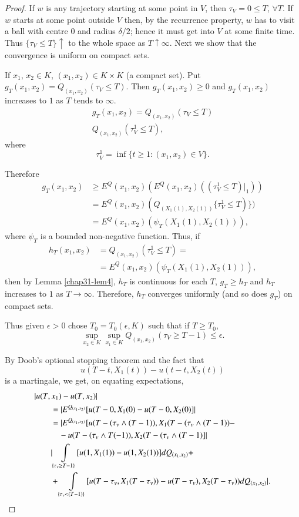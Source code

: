 \begin{proof}
If $w$ is any trajectory starting at some point in $V$, then
$\tau_{V}=0\leq T$, $\forall T$. If $w$ starts at some point outside
$V$ then, by the recurrence property, $w$ has to visit a ball with
centre $0$ and radius $\delta/2$; hence it must get into $V$ at some
finite time. Thus $\{\tau_{V}\leq T\}\uparrow$ to the whole space as
$T\uparrow \infty$. Next we show that the convergence is uniform on
compact sets.

If $x_{1}$, $x_{2}\in K$, $(x_{1},x_{2})\in K\times K$ (a compact
set). Put $g_{T}(x_{1},x_{2})=Q_{(x_{1},x_{2})}(\tau_{V}\leq T)$. Then
$g_{T}(x_{1},x_{2})\geq 0$ and $g_{T}(x_{1},x_{2})$ increases to $1$
as $T$ tends to $\infty$.
\begin{gather*}
g_{T}(x_{1},x_{2})=Q_{(x_{1},x_{2})}(\tau_{V}\leq T)\\
Q_{(x_{1},x_{2})}(\tau^{1}_{V}\leq T),
\end{gather*}\pageoriginale
where 
$$
\tau^{1}_{V}=\inf \{t\geq 1:(x_{1},x_{2})\in V\}.
$$

Therefore
\begin{align*}
g_{T}(x_{1},x_{2}) &\geq
E^{Q}(x_{1},x_{2})(E^{Q}(x_{1},x_{2})((\tau^{1}_{V}\leq T)|_{1}))\\
&= E^{Q}(x_{1},x_{2})(Q_{(X_{1}(1),X_{2}(1))}\{\tau^{1}_{V}\leq
T)\})\\
&= E^{Q}(x_{1},x_{2})(\psi_{T}(X_{1}(1),X_{2}(1))),
\end{align*}
where $\psi_{T}$ is a bounded non-negative function. Thus, if 
\begin{align*}
h_{T}(x_{1},x_{2}) &= Q_{(x_{1},x_{2})}(\tau^{1}_{V}\leq T)=\\
&= E^{Q}(x_{1},x_{2})(\psi_{T}(X_{1}(1),X_{2}(1))),
\end{align*}
then by Lemma \ref{chap31-lem4}, $h_{T}$ is continuous for each $T$,
$g_{T}\geq h_{T}$ and $h_{T}$ increases to $1$ as $T\to
\infty$. Therefore, $h_{T}$ converges uniformly (and so does $g_{T}$)
on compact sets.

Thus given $\epsilon>0$ chose $T_{0}=T_{0}(\epsilon,K)$ such that if
$T\geq T_{0}$,
$$
\sup\limits_{x_{2}\in K}\sup\limits_{x_{1}\in
  K}Q_{(x_{1},x_{2})}(\tau_{V}\geq T-1)\leq \epsilon.
$$

By Doob's optional stopping theorem and the fact that
$$
u(T-t,X_{1}(t))-u(t-t,X_{2}(t))
$$ 
is a martingale, we get, on equating
expectations, 
{\fontsize{10pt}{12pt}\selectfont
\begin{align*}
& |u(T,x_{1})-u(T,x_{2})|\\
&\qquad =|E^{Q_{(x_{1},x_{2})}}[u(T-0,X_{1}(0)-u(T-0,X_{2}(0)]|\\
&\qquad =|E^{Q_{(x_{1},x_{2})}}[u(T-(\tau_{v}\wedge
    (T-1)),X_{1}(T-(\tau_{v}\wedge (T-1))-\\
&\qquad\quad -u(T-(\tau_{v}\wedge T(-1)),X_{2}(T-(\tau_{v}\wedge (T-1)]|\\
&\qquad |\int\limits_{\{\tau_{v}\geq
    T-1\}}[u(1,X_{1}(1))-u(1,X_{2}(1))]dQ_{(x_{1},x_{2})}+\\
&\qquad +\int\limits_{\{\tau_{v}<(T-1)\}}[u(T-\tau_{v},X_{1}(T-\tau_{v}))-u(T-\tau_{v}),X_{2}(T-\tau_{v}))dQ_{(x_{1},x_{2})}|. 
\end{align*}}\relax\pageoriginale


\end{proof}
